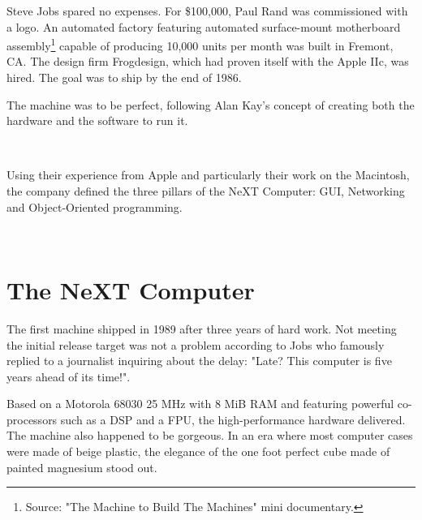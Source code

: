 \par
Steve Jobs spared no expenses. For \$100,000, Paul Rand was commissioned with a logo. An automated factory featuring automated surface-mount motherboard assembly\footnote{Source: "The Machine to Build The Machines" mini documentary.} capable of producing 10,000 units per month was built in Fremont, CA. The design firm Frogdesign, which had proven itself with the Apple IIc, was hired. The goal was to ship by the end of 1986.\\
\par
The machine was to be perfect, following Alan Kay's concept of creating both the hardware and the software to run it.\\
\par
{}\\
\par

Using their experience from Apple and particularly their work on the Macintosh, the company defined the three pillars of the NeXT Computer: GUI, Networking and Object-Oriented programming.\\
\par
{}\\






\par
\section{The NeXT Computer}
The first machine shipped in 1989 after three years of hard work. Not meeting the initial release target was not a problem according to Jobs who famously replied to a journalist inquiring about the delay: "Late? This computer is five years ahead of its time!".\\
\par
Based on a Motorola 68030 25 MHz with 8 MiB RAM and featuring powerful co-processors such as a DSP and a FPU, the high-performance hardware delivered. The machine also happened to be gorgeous. In an era where most computer cases were made of beige plastic, the elegance of the one foot perfect cube made of painted magnesium stood out.\\
\par
{}


